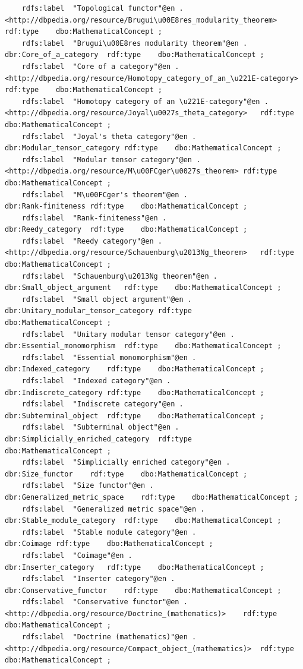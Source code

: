 \begin{verbatim}
	rdfs:label	"Topological functor"@en .
<http://dbpedia.org/resource/Brugui\u00E8res_modularity_theorem>	rdf:type	dbo:MathematicalConcept ;
	rdfs:label	"Brugui\u00E8res modularity theorem"@en .
dbr:Core_of_a_category	rdf:type	dbo:MathematicalConcept ;
	rdfs:label	"Core of a category"@en .
<http://dbpedia.org/resource/Homotopy_category_of_an_\u221E-category>	rdf:type	dbo:MathematicalConcept ;
	rdfs:label	"Homotopy category of an \u221E-category"@en .
<http://dbpedia.org/resource/Joyal\u0027s_theta_category>	rdf:type	dbo:MathematicalConcept ;
	rdfs:label	"Joyal's theta category"@en .
dbr:Modular_tensor_category	rdf:type	dbo:MathematicalConcept ;
	rdfs:label	"Modular tensor category"@en .
<http://dbpedia.org/resource/M\u00FCger\u0027s_theorem>	rdf:type	dbo:MathematicalConcept ;
	rdfs:label	"M\u00FCger's theorem"@en .
dbr:Rank-finiteness	rdf:type	dbo:MathematicalConcept ;
	rdfs:label	"Rank-finiteness"@en .
dbr:Reedy_category	rdf:type	dbo:MathematicalConcept ;
	rdfs:label	"Reedy category"@en .
<http://dbpedia.org/resource/Schauenburg\u2013Ng_theorem>	rdf:type	dbo:MathematicalConcept ;
	rdfs:label	"Schauenburg\u2013Ng theorem"@en .
dbr:Small_object_argument	rdf:type	dbo:MathematicalConcept ;
	rdfs:label	"Small object argument"@en .
dbr:Unitary_modular_tensor_category	rdf:type	dbo:MathematicalConcept ;
	rdfs:label	"Unitary modular tensor category"@en .
dbr:Essential_monomorphism	rdf:type	dbo:MathematicalConcept ;
	rdfs:label	"Essential monomorphism"@en .
dbr:Indexed_category	rdf:type	dbo:MathematicalConcept ;
	rdfs:label	"Indexed category"@en .
dbr:Indiscrete_category	rdf:type	dbo:MathematicalConcept ;
	rdfs:label	"Indiscrete category"@en .
dbr:Subterminal_object	rdf:type	dbo:MathematicalConcept ;
	rdfs:label	"Subterminal object"@en .
dbr:Simplicially_enriched_category	rdf:type	dbo:MathematicalConcept ;
	rdfs:label	"Simplicially enriched category"@en .
dbr:Size_functor	rdf:type	dbo:MathematicalConcept ;
	rdfs:label	"Size functor"@en .
dbr:Generalized_metric_space	rdf:type	dbo:MathematicalConcept ;
	rdfs:label	"Generalized metric space"@en .
dbr:Stable_module_category	rdf:type	dbo:MathematicalConcept ;
	rdfs:label	"Stable module category"@en .
dbr:Coimage	rdf:type	dbo:MathematicalConcept ;
	rdfs:label	"Coimage"@en .
dbr:Inserter_category	rdf:type	dbo:MathematicalConcept ;
	rdfs:label	"Inserter category"@en .
dbr:Conservative_functor	rdf:type	dbo:MathematicalConcept ;
	rdfs:label	"Conservative functor"@en .
<http://dbpedia.org/resource/Doctrine_(mathematics)>	rdf:type	dbo:MathematicalConcept ;
	rdfs:label	"Doctrine (mathematics)"@en .
<http://dbpedia.org/resource/Compact_object_(mathematics)>	rdf:type	dbo:MathematicalConcept ;

\end{verbatim}
